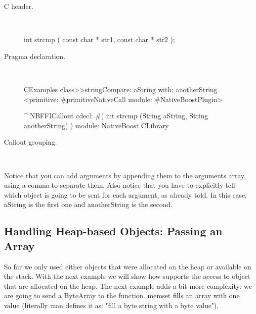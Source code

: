 \documentclass[a4paper,10pt,twoside]{book}
\begin{document}
\begin{description}
\item [C header.] \ 

\begin{code}{}
int strcmp ( const char * str1, const char * str2 );
\end{code}

\item [Pragma declaration.] \ 

\begin{code}{}
CExamples class>>stringCompare: aString with: anotherString
	<primitive: #primitiveNativeCall module: #NativeBoostPlugin>
	
	^ NBFFICallout cdecl: #( int strcmp (String aString, String anotherString) ) module: NativeBoost CLibrary
\end{code}


\item [Callout grouping.] \ 
 

\end{description}

Notice that you can add arguments by appending them to the arguments array,
using a comma to separate them. Also notice that you have to explicitly tell
which object is going to be sent for each argument, as already told. In this
case, aString is the first one and anotherString is the second.



\subsection{Handling Heap-based Objects: Passing an Array}
So far we only used either objects that were allocated on the heap or available on the stack. 
With the next example we will show how \Spock supports the access to object that are allocated on the heap.
The next example adds a bit more complexity: we are going to send a ByteArray
to the  function. memset fills an array with one value (literally man defines it as: "fill a byte string with a byte value").
\end{document}
